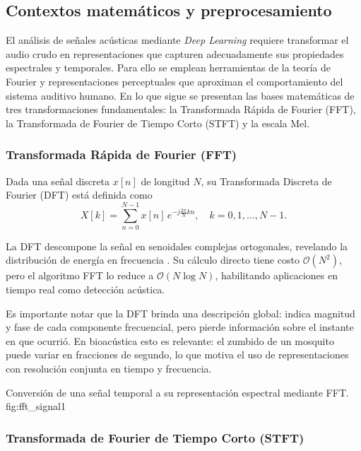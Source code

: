 \subsection{Contextos matemáticos y preprocesamiento}
\label{sec:dl_preproc}

El análisis de señales acústicas mediante \emph{Deep Learning} requiere transformar el audio crudo en representaciones que capturen adecuadamente sus propiedades espectrales y temporales.  
Para ello se emplean herramientas de la teoría de Fourier y representaciones perceptuales que aproximan el comportamiento del sistema auditivo humano.  
En lo que sigue se presentan las bases matemáticas de tres transformaciones fundamentales: la Transformada Rápida de Fourier (FFT), la Transformada de Fourier de Tiempo Corto (STFT) y la escala Mel.

\subsubsection{Transformada Rápida de Fourier (FFT)}

Dada una señal discreta $x[n]$ de longitud $N$, su Transformada Discreta de Fourier (DFT) está definida como
\begin{equation}
	X[k] = \sum_{n=0}^{N-1} x[n] \, e^{-j \tfrac{2\pi}{N} kn}, 
	\quad k = 0,1,\dots,N-1.
	\label{eq:dft}
\end{equation}

La DFT descompone la señal en senoidales complejas ortogonales, revelando la distribución de energía en frecuencia \cite{Haykin2001,Proakis2007}.  
Su cálculo directo tiene costo $\mathcal{O}(N^2)$, pero el algoritmo FFT lo reduce a $\mathcal{O}(N \log N)$, habilitando aplicaciones en tiempo real como detección acústica.  

Es importante notar que la DFT brinda una descripción global: indica magnitud y fase de cada componente frecuencial, pero pierde información sobre el instante en que ocurrió.  
En bioacústica esto es relevante: el zumbido de un mosquito puede variar en fracciones de segundo, lo que motiva el uso de representaciones con resolución conjunta en tiempo y frecuencia.

{Conversión de una señal temporal a su representación espectral mediante FFT.}
{fig:fft_signal}{1}

\subsubsection{Transformada de Fourier de Tiempo Corto (STFT)}

